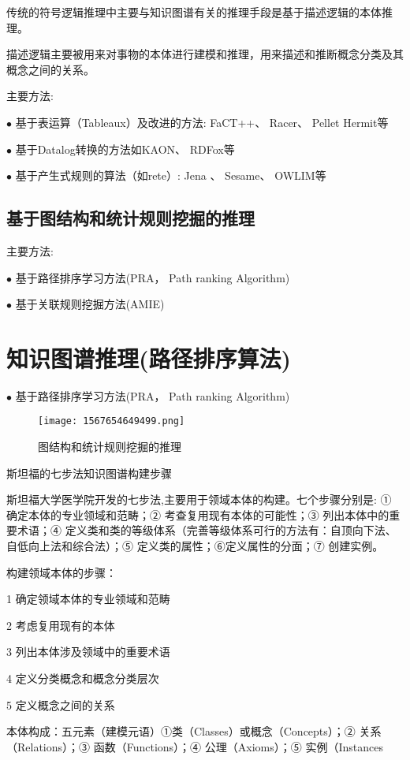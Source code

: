 传统的符号逻辑推理中主要与知识图谱有关的推理手段是基于描述逻辑的本体推理。

描述逻辑主要被⽤来对事物的本体进⾏建模和推理，⽤来描述和推断概念分类及其概念之间的关系。

主要方法:

$\bullet$ 基于表运算（Tableaux）及改进的⽅法: FaCT++、 Racer、 Pellet Hermit等

$\bullet$ 基于Datalog转换的⽅法如KAON、 RDFox等

$\bullet$ 基于产⽣式规则的算法（如rete）:  Jena 、 Sesame、 OWLIM等

\subsection{基于图结构和统计规则挖掘的推理}

主要方法:

$\bullet$ 基于路径排序学习⽅法(PRA， Path ranking Algorithm)

$\bullet$ 基于关联规则挖掘⽅法(AMIE)
\section{知识图谱推理(路径排序算法)}

$\bullet$ 基于路径排序学习⽅法(PRA， Path ranking Algorithm)
\begin{figure}[H]
\centering
\texttt{[image: 1567654649499.png]}
\caption{图结构和统计规则挖掘的推理}
\label{AI321567654649499}
\end{figure}

斯坦福的七步法知识图谱构建步骤

斯坦福大学医学院开发的七步法,主要用于领域本体的构建。七个步骤分别是: ① 确定本体的专业领域和范畴；② 考查复用现有本体的可能性；③ 列出本体中的重要术语；④ 定义类和类的等级体系（完善等级体系可行的方法有：自顶向下法、自低向上法和综合法）；⑤ 定义类的属性；⑥定义属性的分面；⑦ 创建实例。

构建领域本体的步骤：

1 确定领域本体的专业领域和范畴

2 考虑复用现有的本体

3 列出本体涉及领域中的重要术语

4 定义分类概念和概念分类层次

5 定义概念之间的关系

本体构成：五元素（建模元语）①类（Classes）或概念（Concepts）；② 关系（Relations）；③ 函数（Functions）；④ 公理（Axioms）；⑤ 实例（Instances



